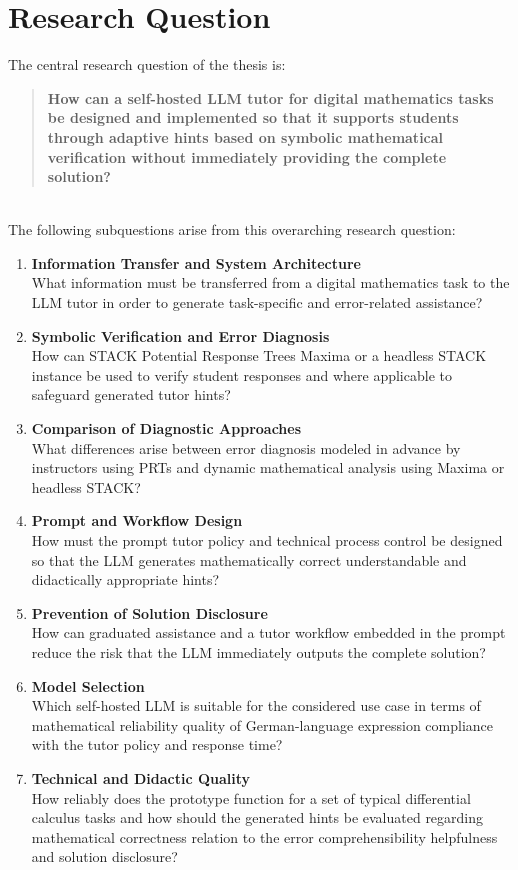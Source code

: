 \documentclass[11pt,a4paper,oneside,ngerman]{memoir}
\begin{document}
\chapter{Research Question}
The central research question of the thesis is:
\begin{quote}
\textbf{How can a self-hosted LLM tutor for digital mathematics tasks be designed and implemented so that it supports students through adaptive hints based on symbolic mathematical verification without immediately providing the complete solution?}
\end{quote}
\hspace{1 cm}\\
The following subquestions arise from this overarching research question:
\begin{enumerate}
    \item \textbf{Information Transfer and System Architecture} \\
    What information must be transferred from a digital mathematics task to the LLM tutor in order to generate task-specific and error-related assistance?
    \item \textbf{Symbolic Verification and Error Diagnosis} \\
    How can STACK Potential Response Trees Maxima or a headless STACK instance be used to verify student responses and where applicable to safeguard generated tutor hints?
    \item \textbf{Comparison of Diagnostic Approaches} \\
    What differences arise between error diagnosis modeled in advance by instructors using PRTs and dynamic mathematical analysis using Maxima or headless STACK?
    \item \textbf{Prompt and Workflow Design} \\
    How must the prompt tutor policy and technical process control be designed so that the LLM generates mathematically correct understandable and didactically appropriate hints?
    \item \textbf{Prevention of Solution Disclosure} \\
    How can graduated assistance and a tutor workflow embedded in the prompt reduce the risk that the LLM immediately outputs the complete solution?
    \item \textbf{Model Selection} \\
    Which self-hosted LLM is suitable for the considered use case in terms of mathematical reliability quality of German-language expression compliance with the tutor policy and response time?
    \item \textbf{Technical and Didactic Quality} \\
    How reliably does the prototype function for a set of typical differential calculus tasks and how should the generated hints be evaluated regarding mathematical correctness relation to the error comprehensibility helpfulness and solution disclosure?
\end{enumerate}
\end{document}

